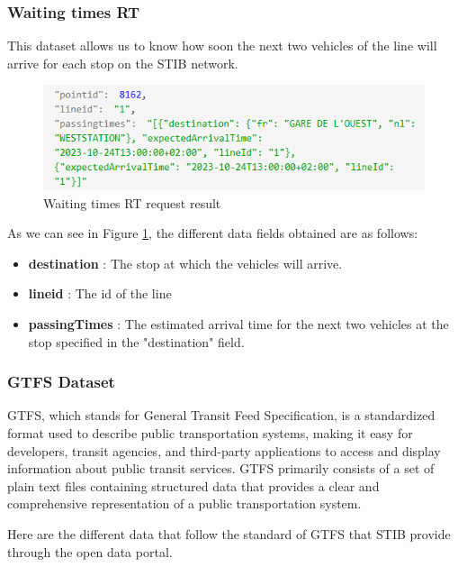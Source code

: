 \documentclass[12pt]{report}
\begin{document}
	\subsubsection{Waiting times RT}
	
	This dataset allows us to know how soon the next two vehicles of the line will arrive for each stop on the STIB network.
	
	\begin{figure}
		\centering
		\includegraphics[width=\textwidth]{images/waiting_times}
		\caption{Waiting times RT request  result}
		\label{waiting_times}
	\end{figure}
	
	As we can see in Figure \ref{waiting_times}, the different data fields obtained are as follows:
	
	\begin{itemize}[noitemsep]
		\item \textbf{destination} : The stop at which the vehicles will arrive.
		\item \textbf{lineid} : The id of the line
		\item \textbf{passingTimes} : The estimated arrival time for the next two vehicles at the stop specified in the "destination" field.
	\end{itemize}	
	
	\subsubsection{GTFS Dataset}
	
	GTFS, which stands for General Transit Feed Specification, is a standardized format used to describe public transportation systems, making it easy for developers, transit agencies, and third-party applications to access and display information about public transit services. GTFS primarily consists of a set of plain text files containing structured data that provides a clear and comprehensive representation of a public transportation system.
	
	Here are the different data that follow the standard of GTFS that STIB provide through the open data portal.
	
\end{document}
